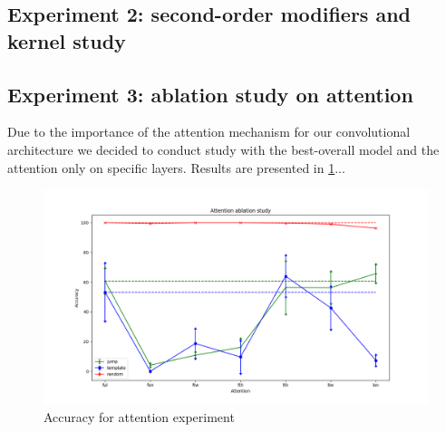 \subsection{Experiment 2: second-order modifiers and kernel study}
\label{subsec:exp2}

\subsection{Experiment 3: ablation study on attention}
\label{subsec:exp3}

Due to the importance of the attention mechanism for our convolutional architecture we decided to conduct study with the best-overall model
and the attention only on specific layers. Results are presented in \ref{fig:exp3}...

\begin{figure}[h]
    \centering
    \includegraphics[width=.5\textwidth,keepaspectratio]{figures/attention_exp.png}
    \caption{Accuracy for attention experiment}
    \label{fig:exp3}
\end{figure}

